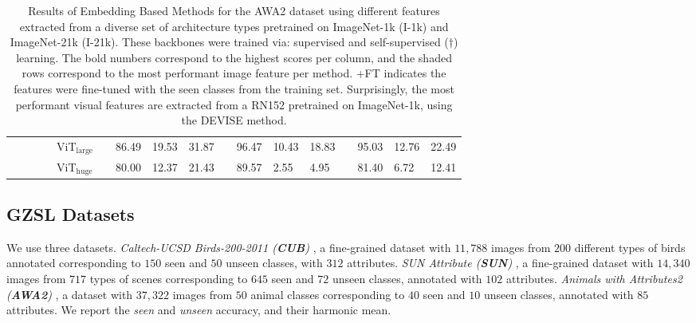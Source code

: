\begin{table}[!htbp]
\begin{tabularx}{\textwidth}{l c l c l c YYY c YYY c YYY}
&& && ViT$_{\text{large}}$ & &
86.49 & 19.53 & 31.87 & &
96.47 & 10.43 & 18.83 & &
95.03 & 12.76 & 22.49  \\ 

&& && ViT$_{\text{huge}}$ & &
80.00 & 12.37 & 21.43 & &
89.57 & 2.55 & 4.95 & &
81.40 & 6.72 & 12.41  \\ 


\bottomrule
\end{tabularx}
\caption{Results of Embedding Based Methods for the AWA2 dataset using different features extracted from a diverse set of architecture types pretrained on ImageNet-1k (I-1k) and ImageNet-21k (I-21k). These backbones were trained via: supervised and self-supervised (${\dag}$) learning. The bold numbers correspond to the highest scores per column, and the shaded rows correspond to the most performant image feature per method. +FT indicates the features were fine-tuned with the seen classes from the training set. Surprisingly, the most performant visual features are extracted from a RN152 pretrained on ImageNet-1k, using the DEVISE method.
}
\label{tab:awa2_embedding_CNN}
\end{table}
\subsection{GZSL Datasets}

We use three datasets. \textit{Caltech-UCSD Birds-200-2011 (\textbf{CUB})} \cite{CUB}, a fine-grained dataset with $11,788$ images from $200$ different types of birds annotated corresponding to $150$ seen and $50$ unseen classes, with $312$ attributes. \textit{SUN Attribute (\textbf{SUN})} \cite{SUN}, a fine-grained dataset with $14,340$ images from $717$ types of scenes corresponding to $645$ seen and $72$ unseen classes, annotated with $102$ attributes. \textit{Animals with Attributes2 (\textbf{AWA2})} \cite{AWA2}, a dataset with $37,322$ images from $50$ animal classes corresponding to $40$ seen and $10$ unseen classes, annotated with $85$ attributes. We report the \textit{seen} and \textit{unseen} accuracy, and their harmonic mean.


\newcommand{\qnote}[1]{{\color{purple}\textbf{{[QJ's:}} {\em #1}\textbf{]}}}

\newcommand{\pnote}[1]{{\color{blue}\textbf{{[PC's:}} {\em #1}\textbf{]}}}



